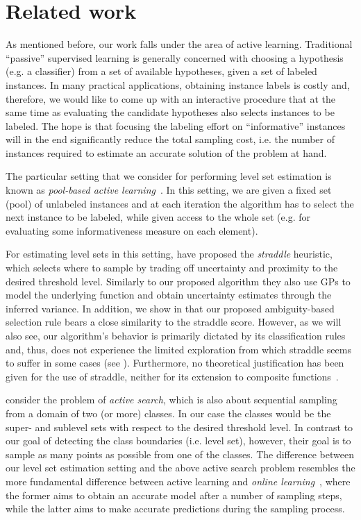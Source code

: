 \chapter{Related work} \label{ch:related}
As mentioned before, our work falls under the area of active learning.
Traditional ``passive'' supervised learning is generally concerned with
choosing a hypothesis (e.g. a classifier) from a set of available hypotheses,
given a set of labeled instances. In many practical applications, obtaining
instance labels is costly and, therefore, we would like to come up
with an interactive procedure that at the same time as evaluating the
candidate hypotheses also selects instances to be labeled. The hope is that
focusing the labeling effort on ``informative'' instances will in the end
significantly reduce the total sampling cost, i.e. the number of instances
required to estimate an accurate solution of the problem at hand.

The particular setting that we consider for performing level set estimation
is known as \emph{pool-based active learning}~\cite{settles12}. In this
setting, we are given a fixed set (pool) of unlabeled instances and at each
iteration the algorithm has to select the next instance to be labeled,
while given access to the whole set (e.g. for evaluating some informativeness
measure on each element).

For estimating level sets in this setting, \citet{bryan05} have proposed the
\emph{straddle} heuristic, which selects where to sample by trading off
uncertainty and proximity to the desired threshold level. Similarly to our
proposed algorithm they also use GPs to model the underlying function and
obtain uncertainty estimates through the inferred variance. In addition, we
show in  that our proposed ambiguity-based selection rule
bears a close similarity to the straddle score. However, as we will also see,
our algorithm's behavior is primarily dictated by its classification rules
and, thus, does not experience the limited exploration from which straddle
seems to suffer in some cases (see ).
Furthermore, no theoretical justification has been given for the use of
straddle, neither for its extension to composite functions~\cite{bryan08}.

\citet{garnett12} consider the problem of
\emph{active search}, which is also about sequential sampling from a domain of
two (or more) classes. In our case the classes would be the super- and sublevel
sets with respect to the desired threshold level.
In contrast to our goal of detecting the class boundaries (i.e. level set),
however, their goal is to sample as many points as possible from one of the
classes. The difference between our level set estimation setting and the above
active search problem resembles the more fundamental difference between active
learning and
\emph{online learning}~\cite{shalev12}, where the former aims to obtain
an accurate model after a number of sampling steps, while the latter aims
to make accurate predictions during the sampling process.

